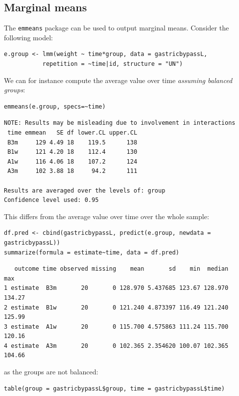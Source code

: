 \documentclass[12pt]{article}
\begin{document}
\subsection{Marginal means}
\label{sec:orgc4cbd11}

The \texttt{emmeans} package can be used to output marginal means. Consider
the following model:
\lstset{language=r,label= ,caption= ,captionpos=b,numbers=none}
\begin{lstlisting}
e.group <- lmm(weight ~ time*group, data = gastricbypassL,
	       repetition = ~time|id, structure = "UN")
\end{lstlisting}

We can for instance compute the average value over time \emph{assuming balanced groups}:
\lstset{language=r,label= ,caption= ,captionpos=b,numbers=none}
\begin{lstlisting}
emmeans(e.group, specs=~time)
\end{lstlisting}

\begin{verbatim}
NOTE: Results may be misleading due to involvement in interactions
 time emmean   SE df lower.CL upper.CL
 B3m     129 4.49 18    119.5      138
 B1w     121 4.20 18    112.4      130
 A1w     116 4.06 18    107.2      124
 A3m     102 3.88 18     94.2      111

Results are averaged over the levels of: group 
Confidence level used: 0.95
\end{verbatim}


This differs from the average value over time over the whole sample:
\lstset{language=r,label= ,caption= ,captionpos=b,numbers=none}
\begin{lstlisting}
df.pred <- cbind(gastricbypassL, predict(e.group, newdata = gastricbypassL))
summarize(formula = estimate~time, data = df.pred)
\end{lstlisting}

\begin{verbatim}
   outcome time observed missing    mean       sd    min  median    max
1 estimate  B3m       20       0 128.970 5.437685 123.67 128.970 134.27
2 estimate  B1w       20       0 121.240 4.873397 116.49 121.240 125.99
3 estimate  A1w       20       0 115.700 4.575863 111.24 115.700 120.16
4 estimate  A3m       20       0 102.365 2.354620 100.07 102.365 104.66
\end{verbatim}


as the groups are not balanced:
\lstset{language=r,label= ,caption= ,captionpos=b,numbers=none}
\begin{lstlisting}
table(group = gastricbypassL$group, time = gastricbypassL$time)
\end{lstlisting}
\end{document}

